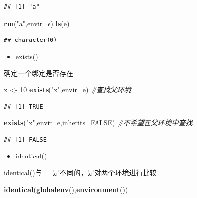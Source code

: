 \documentclass[]{book}
\newenvironment{Shaded}{\begin{snugshade}}{\end{snugshade}}
\newcommand{\KeywordTok}[1]{\textcolor[rgb]{0.13,0.29,0.53}{\textbf{#1}}}
\newcommand{\DataTypeTok}[1]{\textcolor[rgb]{0.13,0.29,0.53}{#1}}
\newcommand{\DecValTok}[1]{\textcolor[rgb]{0.00,0.00,0.81}{#1}}
\newcommand{\StringTok}[1]{\textcolor[rgb]{0.31,0.60,0.02}{#1}}
\newcommand{\CommentTok}[1]{\textcolor[rgb]{0.56,0.35,0.01}{\textit{#1}}}
\newcommand{\OtherTok}[1]{\textcolor[rgb]{0.56,0.35,0.01}{#1}}
\newcommand{\NormalTok}[1]{#1}
\providecommand{\tightlist}{%
  \setlength{\itemsep}{0pt}\setlength{\parskip}{0pt}}
\begin{document}
\begin{verbatim}
## [1] "a"
\end{verbatim}

\begin{Shaded}
\begin{Highlighting}[]
\KeywordTok{rm}\NormalTok{(}\StringTok{"a"}\NormalTok{,}\DataTypeTok{envir=}\NormalTok{e)}
\KeywordTok{ls}\NormalTok{(e)}
\end{Highlighting}
\end{Shaded}

\begin{verbatim}
## character(0)
\end{verbatim}

\begin{itemize}
\tightlist
\item
  exists()
\end{itemize}

确定一个绑定是否存在

\begin{Shaded}
\begin{Highlighting}[]
\NormalTok{x <-}\StringTok{ }\DecValTok{10}
\KeywordTok{exists}\NormalTok{(}\StringTok{"x"}\NormalTok{,}\DataTypeTok{envir=}\NormalTok{e) }\CommentTok{#查找父环境}
\end{Highlighting}
\end{Shaded}

\begin{verbatim}
## [1] TRUE
\end{verbatim}

\begin{Shaded}
\begin{Highlighting}[]
\KeywordTok{exists}\NormalTok{(}\StringTok{"x"}\NormalTok{,}\DataTypeTok{envir=}\NormalTok{e,}\DataTypeTok{inherits=}\OtherTok{FALSE}\NormalTok{) }\CommentTok{#不希望在父环境中查找}
\end{Highlighting}
\end{Shaded}

\begin{verbatim}
## [1] FALSE
\end{verbatim}

\begin{itemize}
\tightlist
\item
  identical()
\end{itemize}

identical()与==是不同的，是对两个环境进行比较

\begin{Shaded}
\begin{Highlighting}[]
\KeywordTok{identical}\NormalTok{(}\KeywordTok{globalenv}\NormalTok{(),}\KeywordTok{environment}\NormalTok{())}
\end{Highlighting}
\end{Shaded}
\end{document}
